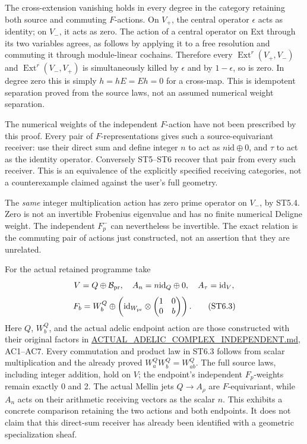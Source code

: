 The cross-extension vanishing holds in every degree in the category
retaining both source and commuting \(F\)-actions. On \(V_+\), the
central operator \(\epsilon\) acts as identity; on \(V_-\), it acts as
zero. The action of a central operator on Ext through its two variables
agrees, as follows by applying it to a free resolution and commuting it
through module-linear cochains. Therefore every
\(\operatorname{Ext}^r(V_+,V_-)\) and \(\operatorname{Ext}^r(V_-,V_+)\)
is simultaneously killed by \(\epsilon\) and by \(1-\epsilon\), so is
zero. In degree zero this is simply \(h=hE=Eh=0\) for a cross-map. This
is idempotent separation proved from the source laws, not an assumed
numerical weight separation.

The numerical weights of the independent \(F\)-action have not been
prescribed by this proof. Every pair of \(F\)-representations gives such
a source-equivariant receiver: use their direct sum and define integer
\(n\) to act as \(n\mathrm{id}\oplus0\), and \(\tau\) to act as the
identity operator. Conversely ST5--ST6 recover that pair from every such
receiver. This is an equivalence of the explicitly specified receiving
categories, not a counterexample claimed against the user's full
geometry.

The \emph{same} integer multiplication action has zero prime operator on
\(V_-\), by ST5.4. Zero is not an invertible Frobenius eigenvalue and
has no finite numerical Deligne weight. The independent \(F_p^-\) can
nevertheless be invertible. The exact relation is the commuting pair of
actions just constructed, not an assertion that they are unrelated.

For the actual retained programme take \[
 V=Q\oplus\mathcal B_{\rm pr},
\quad
 A_n=n\mathrm{id}_Q\oplus0,\quad A_\tau=\mathrm{id}_V,
\] \[
 F_b=W_b^Q\oplus
 \left(\mathrm{id}_{W_{\rm pr}}\otimes
 \begin{pmatrix}1&0\\0&b\end{pmatrix}\right).
\tag{ST6.3}
\] Here \(Q\), \(W_b^Q\), and the actual adelic endpoint action are
those constructed with their original factors in
\url{ACTUAL_ADELIC_COMPLEX_INDEPENDENT.md}, AC1--AC7. Every commutation
and product law in ST6.3 follows from scalar multiplication and the
already proved \(W_a^QW_b^Q=W_{ab}^Q\). The full source laws, including
integer addition, hold on \(V\); the endpoint's independent
\(F_p\)-weights remain exactly 0 and 2. The actual Mellin jets
\(Q\to A_\rho\) are \(F\)-equivariant, while \(A_n\) acts on their
arithmetic receiving vectors as the scalar \(n\). This exhibits a
concrete comparison retaining the two actions and both endpoints. It
does not claim that this direct-sum receiver has already been identified
with a geometric specialization sheaf.

